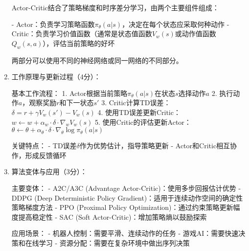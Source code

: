\documentclass[zihao=5,answers]{BHCexam}
\begin{document}
\begin{questions}
\begin{solution}
\begin{enumerate}
    Actor-Critic结合了策略梯度和时序差分学习，由两个主要组件组成：
    
    - Actor：负责学习策略函数$\pi_\theta(a|s)$，决定在每个状态应采取何种动作
    - Critic：负责学习价值函数（通常是状态值函数$V_w(s)$或动作值函数$Q_w(s,a)$），评估当前策略的好坏
    
    两部分可以使用不同的神经网络或同一网络的不同部分。
    
    \item 工作原理与更新过程（4分）：
    
    基本工作流程：
    1. Actor根据当前策略$\pi_\theta(a|s)$在状态$s$选择动作$a$
    2. 执行动作$a$，观察奖励$r$和下一状态$s'$
    3. Critic计算TD误差：$\delta = r + \gamma V_w(s') - V_w(s)$
    4. 使用TD误差更新Critic：$w \leftarrow w + \alpha_w \cdot \delta \cdot \nabla_w V_w(s)$
    5. 使用Critic的评估更新Actor：$\theta \leftarrow \theta + \alpha_\theta \cdot \delta \cdot \nabla_\theta \log \pi_\theta(a|s)$
    
    关键特点：
    - TD误差$\delta$作为优势估计，指导策略更新
    - Actor和Critic相互协作，形成反馈循环
    
    \item 算法变体与应用（3分）：
    
    主要变体：
    - A2C/A3C (Advantage Actor-Critic)：使用多步回报估计优势
    - DDPG (Deep Deterministic Policy Gradient)：适用于连续动作空间的确定性策略梯度方法
    - PPO (Proximal Policy Optimization)：通过约束策略更新幅度提高稳定性
    - SAC (Soft Actor-Critic)：增加策略熵以鼓励探索
    
    应用场景：
    - 机器人控制：需要平滑、连续动作的任务
    - 游戏AI：需要快速决策和在线学习
    - 资源分配：需要在复杂环境中做出序列决策
\end{enumerate}
\end{solution}

\end{questions}
\end{document}

